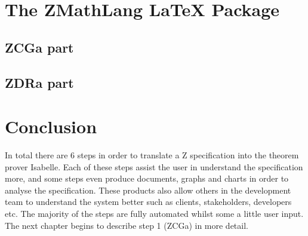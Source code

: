 \section{The ZMathLang LaTeX Package}

\subsection{ZCGa part}

\subsection{ZDRa part}

\section{Conclusion}

In total there are 6 steps in order to translate a Z specification into the theorem prover Isabelle. Each of these steps assist the user in understand the specification more, and some steps even produce documents, graphs and charts in order to analyse the specification. These products also allow others in the development team to understand the system better such as clients, stakeholders, developers etc. The majority of the steps are fully automated whilst some a little user input. The next chapter begins to describe step 1 (ZCGa) in more detail.